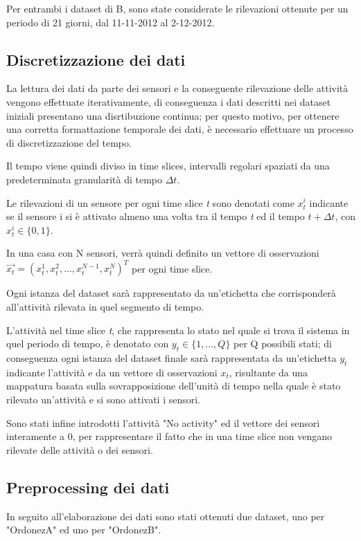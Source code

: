 \documentclass[10pt,a4paper]{article}
\begin{document}
Per entrambi i dataset di B, sono state considerate le rilevazioni ottenute per un periodo di 21 giorni, dal 11-11-2012 al 2-12-2012.

\subsection{Discretizzazione dei dati}
La lettura dei dati da parte dei sensori e la conseguente rilevazione delle attività vengono effettuate iterativamente, di conseguenza i dati descritti nei dataset iniziali presentano una disrtibuzione continua; per questo motivo, per ottenere una corretta formattazione temporale dei dati, è necessario effettuare un processo di discretizzazione del tempo.

Il tempo viene quindi diviso in time slices, intervalli regolari spaziati da una predeterminata granularità di tempo $ \Delta t $.

Le rilevazioni di un sensore per ogni time slice \textit{t} sono denotati come $ x^{i}_{t} $ indicante se il sensore i si è attivato almeno una volta tra il tempo \textit{t} ed il tempo $ t + \Delta t $, con $ x^{i}_{t}  \in  \{0, 1\} $. 

In una casa con N sensori, verrà quindi definito un vettore di osservazioni $ \vec{x_{t}}  = (x^{1}_{t} , x^{2}_{t} , . . . , x^{N-1}_{t} , x^{N}_{t} )^{T} $   per ogni time slice.

Ogni istanza del dataset sarà rappresentato da un'etichetta che corrisponderà all'attività rilevata in quel segmento di tempo.

L'attività nel time slice \textit{t}, che rappresenta lo stato nel quale si trova il sistema in quel periodo di tempo, è denotato con $ y_{t}  \in  \{1, . . . , Q\} $ per Q possibili stati; di conseguenza ogni istanza del dataset finale sarà rappresentata da un'etichetta $ y_{t} $ indicante l'attività e da un vettore di osservazioni $ x_{t} $, risultante da una mappatura basata sulla sovrapposizione dell'unità di tempo nella quale è stato rilevato un'attività e si sono attivati i sensori.

 Sono stati infine introdotti l'attività "No activity" ed il vettore dei sensori interamente a 0, per rappresentare il fatto che in una time slice non vengano rilevate delle attività o dei sensori.

\subsection{Preprocessing dei dati}
In seguito all'elaborazione dei dati sono stati ottenuti due dataset, uno per "OrdonezA" ed uno per "OrdonezB".
\end{document}
